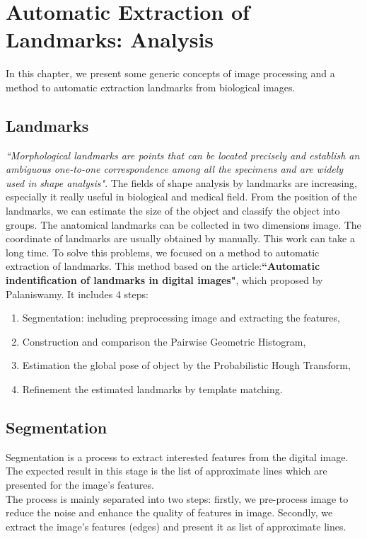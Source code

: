 \chapter{Automatic Extraction of Landmarks: Analysis}
In this chapter, we present some generic concepts of image processing and a method to automatic extraction landmarks from biological images.
\section{Landmarks}
\textit{``Morphological landmarks are points that can be located precisely and establish an ambiguous one-to-one correspondence among all the specimens and are widely used in shape analysis"}\cite{bookstein1997morphometric}. The fields of shape analysis by landmarks are increasing, especially it really useful in biological and medical field. From the position of the landmarks, we can estimate the size of the object and classify the object into groups. The anatomical landmarks can be collected in two dimensions image. The coordinate of landmarks are usually obtained by manually. This work can take a long time. To solve this problems, we focused on a method to automatic extraction of landmarks. This method based on the article:\textbf{``Automatic indentification of landmarks in digital images"}, which proposed by Palaniswamy. It includes 4 steps:
\begin{enumerate}
\item Segmentation: including preprocessing image and extracting the features,
\item Construction and comparison the Pairwise Geometric Histogram,
\item Estimation the global pose of object by the Probabilistic Hough Transform,
\item Refinement the estimated landmarks by template matching.
\end{enumerate}
\section{Segmentation}
Segmentation is a process to extract interested features from the digital image. The expected result in this stage is the list of approximate lines which are presented for the image's features.\\
The process is mainly separated into two steps: firstly, we pre-process image to reduce the noise and enhance the quality of features in image. Secondly, we extract the image's features (edges) and present it as list of approximate lines.
